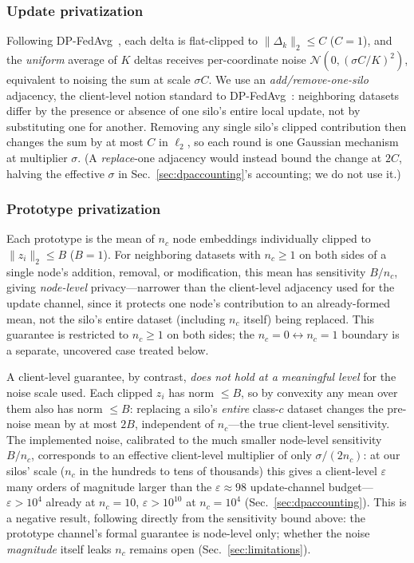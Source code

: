 \documentclass[journal]{IEEEtran}
\newcommand{\eps}{\varepsilon}
\begin{document}
\subsubsection{Update privatization}
Following DP-FedAvg~\cite{dpfedavg}, each delta is flat-clipped to
$\lVert \Delta_k \rVert_2 \le C$ ($C{=}1$), and the \emph{uniform}
average of $K$ deltas receives per-coordinate noise
$\mathcal{N}(0, (\sigma C/K)^{2})$, equivalent to noising the sum at
scale $\sigma C$. We use an \emph{add/remove-one-silo} adjacency, the
client-level notion standard to DP-FedAvg~\cite{dpfedavg}: neighboring
datasets differ by the presence or absence of one silo's entire local
update, not by substituting one for another. Removing any single
silo's clipped contribution then changes the sum by at most $C$ in
$\ell_2$, so each round is one Gaussian mechanism at multiplier
$\sigma$. (A \emph{replace}-one adjacency would instead bound the
change at $2C$, halving the effective $\sigma$ in
Sec.~\ref{sec:dpaccounting}'s accounting; we do not use it.)

\subsubsection{Prototype privatization}
Each prototype is the mean of $n_c$ node embeddings individually
clipped to $\lVert z_i \rVert_2 \le B$ ($B{=}1$). For neighboring
datasets with $n_c \ge 1$ on both sides of a single node's addition,
removal, or modification, this mean has sensitivity $B/n_c$, giving
\emph{node-level} privacy---narrower than the client-level adjacency
used for the update channel, since it protects one node's contribution
to an already-formed mean, not the silo's entire dataset (including
$n_c$ itself) being replaced. This guarantee is restricted to
$n_c \ge 1$ on both sides; the $n_c{=}0 \leftrightarrow n_c{=}1$
boundary is a separate, uncovered case treated below.

A client-level guarantee, by contrast, \emph{does not hold at a
meaningful level} for the noise scale used. Each clipped $z_i$ has
norm $\le B$, so by convexity any mean over them also has norm
$\le B$: replacing a silo's \emph{entire} class-$c$ dataset changes the
pre-noise mean by at most $2B$, independent of $n_c$---the true
client-level sensitivity. The implemented noise, calibrated to the
much smaller node-level sensitivity $B/n_c$, corresponds to an
effective client-level multiplier of only $\sigma/(2n_c)$: at our
silos' scale ($n_c$ in the hundreds to tens of thousands) this gives a
client-level $\eps$ many orders of magnitude larger than the
$\eps{\approx}98$ update-channel budget---$\eps > 10^{4}$ already at
$n_c{=}10$, $\eps > 10^{10}$ at $n_c{=}10^{4}$
(Sec.~\ref{sec:dpaccounting}). This is a negative result, following
directly from the sensitivity bound above: the prototype channel's
formal guarantee is node-level only;
whether the noise \emph{magnitude} itself leaks $n_c$ remains open
(Sec.~\ref{sec:limitations}).
\end{document}
